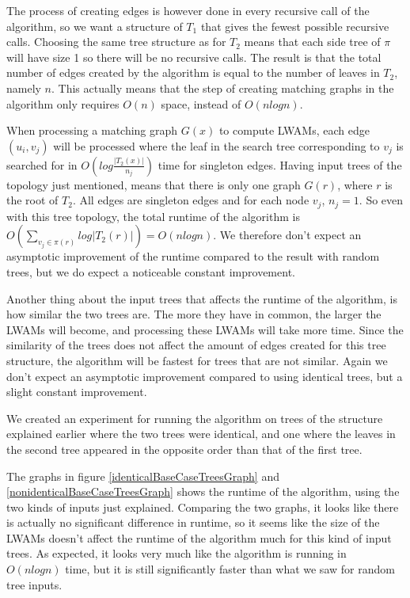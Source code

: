 The process of creating edges is however done in every recursive call of the algorithm, so we want a structure of $T_1$ that gives the fewest possible recursive calls. Choosing the same tree structure as for $T_2$ means that each side tree of $\pi$ will have size 1 so there will be no recursive calls. The result is that the total number of edges created by the algorithm is equal to the number of leaves in $T_2$, namely $n$. This actually means that the step of creating matching graphs in the algorithm only requires $O(n)$ space, instead of $O(nlogn)$.

When processing a matching graph $G(x)$ to compute LWAMs, each edge $(u_i, v_j)$ will be processed where the leaf in the search tree corresponding to $v_j$ is searched for in $O(log\frac{|T_2(x)|}{n_j})$ time for singleton edges. Having input trees of the topology just mentioned, means that there is only one graph $G(r)$, where $r$ is the root of $T_2$. All edges are singleton edges and for each node $v_j$, $n_j = 1$. So even with this tree topology, the total runtime of the algorithm is $O(\sum_{v_j \in \pi(r)} log |T_2(r)|) = O(nlogn)$. We therefore don't expect an asymptotic improvement of the runtime compared to the result with random trees, but we do expect a noticeable constant improvement.

Another thing about the input trees that affects the runtime of the algorithm, is how similar the two trees are. The more they have in common, the larger the LWAMs will become, and processing these LWAMs will take more time. Since the similarity of the trees does not affect the amount of edges created for this tree structure, the algorithm will be fastest for trees that are not similar. Again we don't expect an asymptotic improvement compared to using identical trees, but a slight constant improvement.

We created an experiment for running the algorithm on trees of the structure explained earlier where the two trees were identical, and one where the leaves in the second tree appeared in the opposite order than that of the first tree.

The graphs in figure \ref{identicalBaseCaseTreesGraph} and \ref{nonidenticalBaseCaseTreesGraph} shows the runtime of the algorithm, using the two kinds of inputs just explained. Comparing the two graphs, it looks like there is actually no significant difference in runtime, so it seems like the size of the LWAMs doesn't affect the runtime of the algorithm much for this kind of input trees. As expected, it looks very much like the algorithm is running in $O(nlogn)$ time, but it is still significantly faster than what we saw for random tree inputs.

